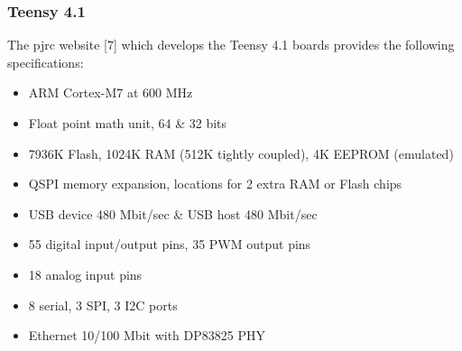 \subsubsection*{Teensy 4.1}
\label{sec:teensy_4_1_specs}

The pjrc website [7] which develops the Teensy 4.1 boards provides the following specifications: 
\begin{itemize}
    \item ARM Cortex-M7 at 600 MHz  
    \item Float point math unit, 64 \& 32 bits  
    \item 7936K Flash, 1024K RAM (512K tightly coupled), 4K EEPROM (emulated)  
    \item QSPI memory expansion, locations for 2 extra RAM or Flash chips  
    \item USB device 480 Mbit/sec \& USB host 480 Mbit/sec  
    \item 55 digital input/output pins, 35 PWM output pins  
    \item 18 analog input pins  
    \item 8 serial, 3 SPI, 3 I2C ports  
    \item Ethernet 10/100 Mbit with DP83825 PHY
\end{itemize}

